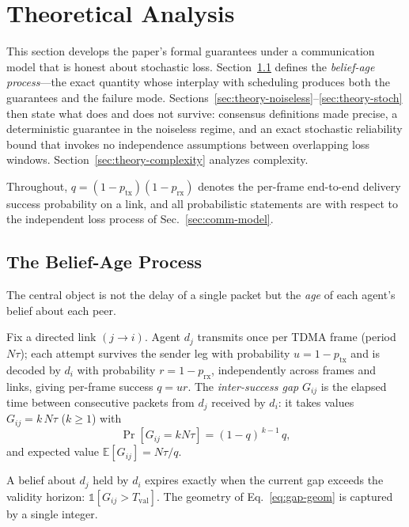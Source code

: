 ﻿\section{Theoretical Analysis}\label{sec:theory}

This section develops the paper's formal guarantees under a communication model that is honest about stochastic loss.
Section~\ref{sec:theory-age} defines the \emph{belief-age process}---the exact quantity whose interplay with scheduling produces both the guarantees and the failure mode.
Sections~\ref{sec:theory-noiseless}--\ref{sec:theory-stoch} then state what does and does not survive: consensus definitions made precise, a deterministic guarantee in the noiseless regime, and an exact stochastic reliability bound that invokes no independence assumptions between overlapping loss windows.
Section~\ref{sec:theory-complexity} analyzes complexity.

Throughout, $q = (1-p_{\mathrm{tx}})(1-p_{\mathrm{rx}})$ denotes the per-frame end-to-end delivery success probability on a link, and all probabilistic statements are with respect to the independent loss process of Sec.~\ref{sec:comm-model}.

\subsection{The Belief-Age Process}\label{sec:theory-age}

The central object is not the delay of a single packet but the \emph{age} of each agent's belief about each peer.

\begin{definition}\label{def:gap}
Fix a directed link $(j \to i)$. Agent $d_j$ transmits once per TDMA frame (period $N\tau$); each attempt survives the sender leg with probability $u = 1 - p_{\mathrm{tx}}$ and is decoded by $d_i$ with probability $r = 1 - p_{\mathrm{rx}}$, independently across frames and links, giving per-frame success $q = ur$.
The \emph{inter-success gap} $G_{ij}$ is the elapsed time between consecutive packets from $d_j$ received by $d_i$: it takes values $G_{ij} = k\,N\tau$ ($k \geq 1$) with
\begin{equation}
    \Pr[G_{ij} = k N\tau] = (1-q)^{\,k-1}\, q,
    \label{eq:gap-geom}
\end{equation}
and expected value $\mathbb{E}[G_{ij}] = N\tau / q$.
\end{definition}

A belief about $d_j$ held by $d_i$ expires exactly when the current gap exceeds the validity horizon: $\mathbb{1}[G_{ij} > T_{\mathrm{val}}]$.
The geometry of Eq.~\eqref{eq:gap-geom} is captured by a single integer.

